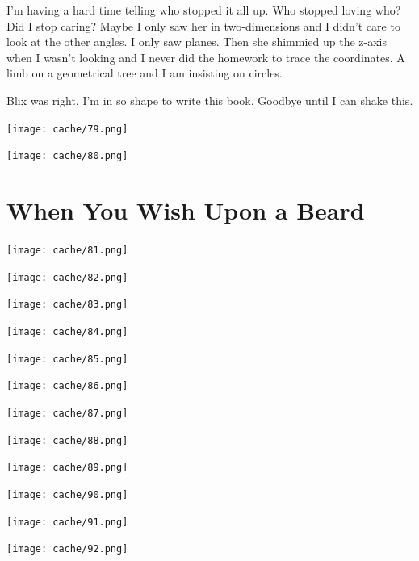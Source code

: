 \documentclass[12pt,twoside]{report}
\begin{document}
I'm having a hard time telling who stopped it all up.  Who stopped
loving who?  Did I stop caring?  Maybe I only saw her in
two-dimensions and I didn't care to look at the other angles.  I only
saw planes.  Then she shimmied up the z-axis when I wasn't looking and
I never did the homework to trace the coordinates.  A limb on a
geometrical tree and I am insisting on circles.

Blix was right.  I'm in so shape to write this book.  Goodbye until I
can shake this.

	\texttt{[image: cache/79.png]}

	\texttt{[image: cache/80.png]}

\newpage
\thispagestyle{empty}
\mbox{}
\newpage
\thispagestyle{empty}
\mbox{}
\cleartooddpage


\chapter{When You Wish Upon a Beard}
\vfill
\texttt{[image: cache/81.png]}
\vspace{4.6cm}
\newpage
\thispagestyle{empty}
\mbox{}
\clearpage


\vspace*{0.6cm} \texttt{[image: cache/82.png]}
\newpage

\vspace*{0.6cm} \texttt{[image: cache/83.png]}
\newpage

\vspace*{0.6cm} \texttt{[image: cache/84.png]}
\newpage

\vspace*{0.6cm} \texttt{[image: cache/85.png]}
\newpage

\vspace*{0.6cm} \texttt{[image: cache/86.png]}
\newpage

\vspace*{0.6cm} \texttt{[image: cache/87.png]}
\newpage

\vspace*{0.6cm} \texttt{[image: cache/88.png]}
\newpage

\vspace*{0.6cm} \texttt{[image: cache/89.png]}
\newpage

\vspace*{0.6cm} \texttt{[image: cache/90.png]}
\newpage

\vspace*{0.6cm} \texttt{[image: cache/91.png]}
\newpage

\vspace*{0.6cm} \texttt{[image: cache/92.png]}
\newpage
\end{document}
